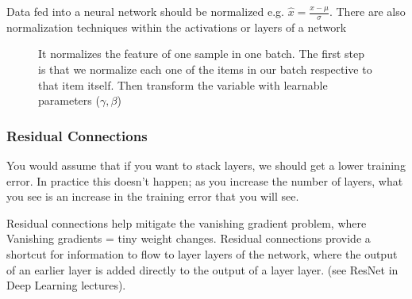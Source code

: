 \documentclass[11pt]{article}
\begin{document}
Data fed into a neural network should be normalized e.g. $\hat x = \frac{x-\mu}{\sigma}$. There are also normalization techniques within the activations or layers of a network

\begin{figure}[H]
    \centering
    \caption*{It normalizes the feature of one sample in one batch. The first step is that we normalize each one of the items in our batch respective to that item itself. Then transform the variable with learnable parameters ($\gamma, \beta$)}
\end{figure}

\subsubsection{Residual Connections}

You would assume that if you want to stack layers, we should get a lower training error. In practice this doesn't happen; as you increase the number of layers, what you see is an increase in the training error that you will see.

Residual connections help mitigate the vanishing gradient problem, where Vanishing gradients = tiny weight changes. Residual connections provide a shortcut for information to flow to layer layers of the network, where the output of an earlier layer is added directly to the output of a layer layer. (see ResNet in Deep Learning lectures).
\end{document}
